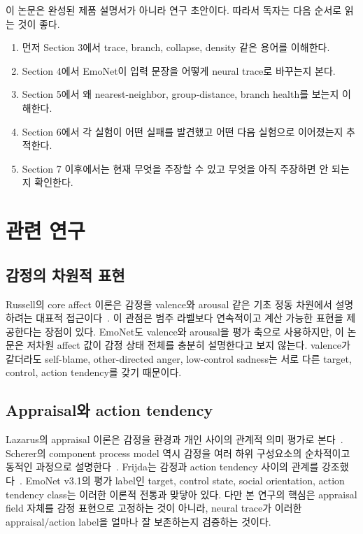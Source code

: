 \documentclass[11pt,a4paper]{article}
\begin{document}
이 논문은 완성된 제품 설명서가 아니라 연구 초안이다. 따라서 독자는 다음 순서로 읽는 것이 좋다.

\begin{enumerate}
  \item 먼저 Section 3에서 trace, branch, collapse, density 같은 용어를 이해한다.
  \item Section 4에서 EmoNet이 입력 문장을 어떻게 neural trace로 바꾸는지 본다.
  \item Section 5에서 왜 nearest-neighbor, group-distance, branch health를 보는지 이해한다.
  \item Section 6에서 각 실험이 어떤 실패를 발견했고 어떤 다음 실험으로 이어졌는지 추적한다.
  \item Section 7 이후에서는 현재 무엇을 주장할 수 있고 무엇을 아직 주장하면 안 되는지 확인한다.
\end{enumerate}

\section{관련 연구}

\subsection{감정의 차원적 표현}

Russell의 core affect 이론은 감정을 valence와 arousal 같은 기초 정동 차원에서 설명하려는 대표적 접근이다~\cite{russell2003core}. 이 관점은 범주 라벨보다 연속적이고 계산 가능한 표현을 제공한다는 장점이 있다. EmoNet도 valence와 arousal을 평가 축으로 사용하지만, 이 논문은 저차원 affect 값이 감정 상태 전체를 충분히 설명한다고 보지 않는다. valence가 같더라도 self-blame, other-directed anger, low-control sadness는 서로 다른 target, control, action tendency를 갖기 때문이다.

\subsection{Appraisal와 action tendency}

Lazarus의 appraisal 이론은 감정을 환경과 개인 사이의 관계적 의미 평가로 본다~\cite{lazarus1991emotion}. Scherer의 component process model 역시 감정을 여러 하위 구성요소의 순차적이고 동적인 과정으로 설명한다~\cite{scherer2001appraisal}. Frijda는 감정과 action tendency 사이의 관계를 강조했다~\cite{frijda1987action}. EmoNet v3.1의 평가 label인 target, control state, social orientation, action tendency class는 이러한 이론적 전통과 맞닿아 있다. 다만 본 연구의 핵심은 appraisal field 자체를 감정 표현으로 고정하는 것이 아니라, neural trace가 이러한 appraisal/action label을 얼마나 잘 보존하는지 검증하는 것이다.
\end{document}
